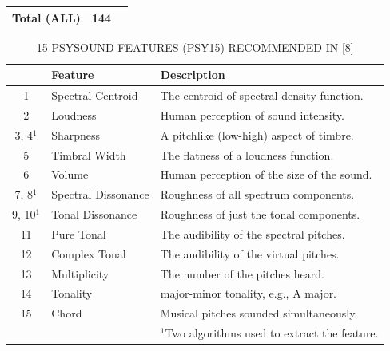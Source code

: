 \documentclass[journal, twoside]{IEEEtran}
\begin{document}
\begin{table}[ht]
\begin{tabular}{ccl}
Total (ALL)                                                                & 144                                                         &                                                                                                                                                                             \\ \hline
\end{tabular}
    
\end{table}


\vspace{.5cm}
\begin{table}[ht]
    \centering
        \caption{15 PSYSOUND FEATURES (PSY15) RECOMMENDED IN [8]}
        \label{table3}
    
    \begin{tabular}{cll}
\hline
\multicolumn{1}{l}{} & Feature             & Description                                \\ \hline
1                    & Spectral Centroid   & The centroid of spectral density function. \\
2                    & Loudness            & Human perception of sound intensity.       \\
3, 4\(^1\)            & Sharpness           & A pitchlike (low-high) aspect of timbre.   \\
5                    & Timbral Width       & The flatness of a loudness function.       \\
6                    & Volume              & Human perception of the size of the sound. \\
7, 8\(^1\)          & Spectral Dissonance & Roughness of all spectrum components.      \\
9, 10\(^1\)         & Tonal Dissonance    & Roughness of just the tonal components.    \\
11                   & Pure Tonal          & The audibility of the spectral pitches.    \\
12                   & Complex Tonal       & The audibility of the virtual pitches.     \\
13                   & Multiplicity        & The number of the pitches heard.           \\
14                   & Tonality            & major-minor tonality, e.g., A major.       \\
15                   & Chord               & Musical pitches sounded simultaneously. \\
\hline \hline
 & & \(^1\)Two algorithms used to extract the feature.
\end{tabular}
    
\end{table}
\egroup
\end{document}
